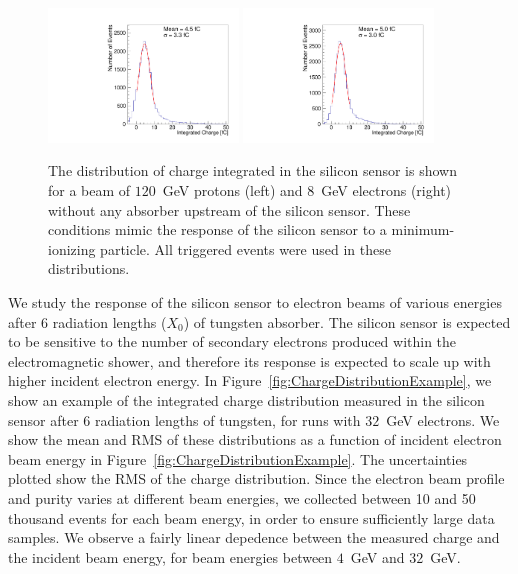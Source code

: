 \documentclass[preprint,1p]{elsarticle}
\begin{document}
\begin{figure}[htbp] 
\centering
\includegraphics[width=0.45\textwidth]{plots/Proton_charge.pdf} 
\includegraphics[width=0.45\textwidth]{plots/Electron_0X0_charge.pdf} 
\caption{The distribution of charge integrated in the silicon sensor is shown
for a beam of $120$~GeV protons (left) and $8$~GeV electrons (right) without any
absorber upstream of the silicon sensor. These conditions mimic the response of the silicon sensor to a
minimum-ionizing particle. All triggered events were used in these
distributions.} 
\label{fig:MIP} 
\end{figure} 

We study the response of the silicon sensor to electron beams of various
energies after 6 radiation lengths ($X_0$) of tungsten absorber. The silicon
sensor is expected to be sensitive to the number of secondary electrons produced
within the electromagnetic shower, and therefore its response is expected to
scale up with higher incident electron energy. In
Figure~\ref{fig:ChargeDistributionExample}, we show an example of the integrated
charge distribution measured in the silicon sensor after 6 radiation lengths of
tungsten, for runs with $32$~GeV electrons. We show the mean and RMS of
these distributions as a function of incident electron beam energy in
Figure~\ref{fig:ChargeDistributionExample}. The uncertainties plotted show the RMS of the
charge distribution. Since the electron beam profile and purity varies at different beam energies, we collected between 10 and 50 thousand events for each beam energy, in order to ensure sufficiently large data samples. We observe a fairly linear depedence between the measured
charge and the incident beam energy, for beam energies between $4$~GeV and
$32$~GeV. 
\end{document}
